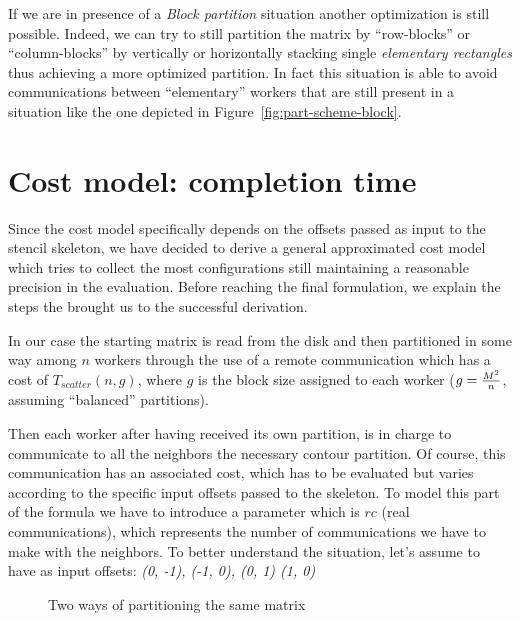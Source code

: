 If we are in presence of a \emph{Block partition} situation another
optimization is still possible. Indeed, we can try to still partition
the matrix by ``row-blocks'' or ``column-blocks'' by vertically or
horizontally stacking single \emph{elementary rectangles} thus achieving
a more optimized partition. In fact this situation is able to avoid
communications between ``elementary'' workers that are still present in
a situation like the one depicted in Figure~\ref{fig:part-scheme-block}.

\section{Cost model: completion time}

Since the cost model specifically depends on the offsets passed as input
to the stencil skeleton, we have decided to derive a general
approximated cost model which tries to collect the most configurations
still maintaining a reasonable precision in the evaluation. Before
reaching the final formulation, we explain the steps the brought us to
the successful derivation.

In our case the starting matrix is read from the disk and then
partitioned in some way among $n$ workers through the use of a remote
communication which has a cost of $T_{scatter}(n,g)$, where $g$ is the
block size assigned to each worker ($g = {M^{2}\over n}$, assuming
``balanced'' partitions).

Then each worker after having received its own partition, is in charge
to communicate to all the neighbors the necessary contour partition. Of
course, this communication has an associated cost, which has to be
evaluated but varies according to the specific input offsets passed to
the skeleton. To model this part of the formula we have to introduce a
parameter which is $rc$ (real communications), which represents the
number of communications we have to make with the neighbors. To better
understand the situation, let's assume to have as input offsets:
\emph{(0, -1), (-1, 0), (0, 1) (1, 0)}

\begin{figure}[!h]
  \centering
  \quad
  \caption{Two ways of partitioning the same matrix}
  \label{fig:part-overview}
\end{figure}

